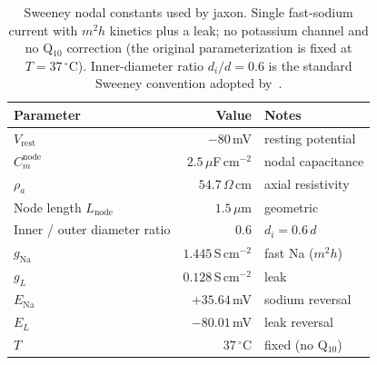\begin{table}[h]
  \centering
  \caption{Sweeney nodal constants used by jaxon.  Single fast-sodium
    current with $m^2 h$ kinetics plus a leak; no potassium channel
    and no Q$_{10}$ correction (the original parameterization is fixed
    at $T = 37\,^\circ$C).  Inner-diameter ratio $d_i / d = 0.6$ is
    the standard Sweeney convention adopted by~\cite{musselman2023}.}
  \label{tab:app-sweeney}
  \small
  \begin{tabular}{l r p{4.7cm}}
    \toprule
    Parameter & Value & Notes \\
    \midrule
    $V_{\mathrm{rest}}$       & $-80$\,mV   & resting potential \\
    $C_m^{\mathrm{node}}$     & $2.5\,\mu$F\,cm$^{-2}$ & nodal capacitance \\
    $\rho_a$                  & $54.7\,\Omega$\,cm       & axial resistivity \\
    Node length $L_{\mathrm{node}}$ & $1.5\,\mu$m & geometric \\
    Inner / outer diameter ratio    & $0.6$       & $d_i = 0.6\,d$ \\
    $g_{\mathrm{Na}}$         & $1.445$\,S\,cm$^{-2}$ & fast Na ($m^2 h$) \\
    $g_L$                     & $0.128$\,S\,cm$^{-2}$   & leak \\
    $E_{\mathrm{Na}}$         & $+35.64$\,mV & sodium reversal \\
    $E_L$                     & $-80.01$\,mV  & leak reversal \\
    $T$                       & $37\,^\circ$C  & fixed (no Q$_{10}$) \\
    \bottomrule
  \end{tabular}
\end{table}

